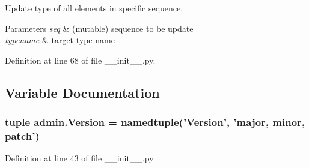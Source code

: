 Update type of all elements in specific sequence. 


\begin{DoxyParams}{Parameters}
{\em seq} & (mutable) sequence to be update \\
\hline
{\em typename} & target type name \\
\hline
\end{DoxyParams}


Definition at line 68 of file \-\_\-\-\_\-init\-\_\-\-\_\-.\-py.



\subsection{Variable Documentation}
\hypertarget{namespaceadmin_acbbc1dce90a9452383bd52c69b4a7489}{
\subsubsection[{Version}]{\setlength{\rightskip}{0pt plus 5cm}tuple admin.\-Version = namedtuple('Version', 'major, minor, patch')}}\label{namespaceadmin_acbbc1dce90a9452383bd52c69b4a7489}


Definition at line 43 of file \-\_\-\-\_\-init\-\_\-\-\_\-.\-py.

